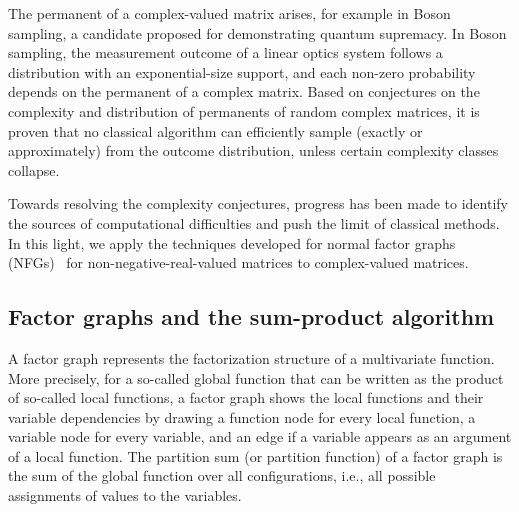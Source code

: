 \documentclass[conference]{IEEEtran}
\theoremstyle{plain}
\theoremstyle{definition}
\begin{document}

The permanent of a complex-valued matrix arises, for example in Boson sampling,
a candidate proposed \cite{aaronsonComputationalComplexityLinear2013} for
demonstrating quantum supremacy. In Boson sampling, the measurement outcome of
a linear optics system follows a distribution with an exponential-size support,
and each non-zero probability depends on the permanent of a complex matrix.
Based on conjectures on the complexity and distribution of permanents of random
complex matrices, it is proven \cite{aaronsonComputationalComplexityLinear2013}
that no classical algorithm can efficiently sample (exactly or approximately)
from the outcome distribution, unless certain complexity classes collapse.


Towards resolving the complexity conjectures, progress
\cite{aaronsonBosonSamplingFarUniform2013,eldarApproximatingPermanentRandom2018,
jiApproximatingPermanentRandom2021,nezamiPermanentRandomMatrices2021,chabaudResourcesBosonicQuantum2023}
has been made to identify the sources of computational difficulties and push
the limit of classical methods. In this light, we apply the techniques
developed for normal factor graphs
(NFGs)~\cite{forneyCodesGraphsNormal2001,loeligerIntroductionFactorGraphs2004}
for non-negative-real-valued matrices to complex-valued matrices.


\subsection{Factor graphs and the sum-product algorithm}


A factor graph
\cite{kschischangFactorGraphsSumproduct2001,loeligerIntroductionFactorGraphs2004}
represents the factorization structure of a multivariate function. More
precisely, for a so-called global function that can be written as the product
of so-called local functions, a factor graph shows the local functions and
their variable dependencies by drawing a function node for every local
function, a variable node for every variable, and an edge if a variable appears
as an argument of a local function. The partition sum (or partition function)
of a factor graph is the sum of the global function over all configurations,
i.e., all possible assignments of values to the variables.
\end{document}
